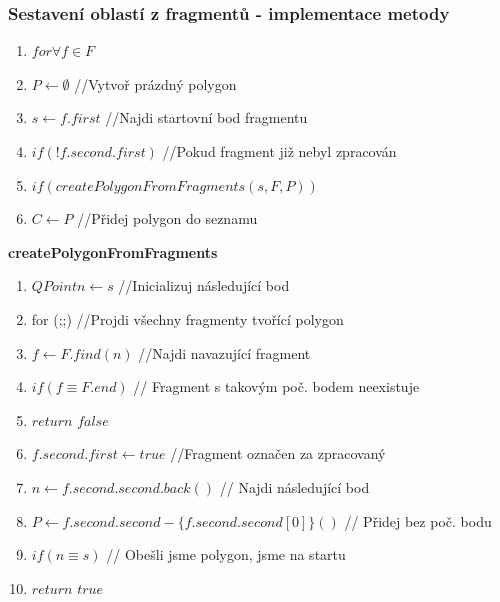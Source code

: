 \documentclass[a4paper, 12pt]{article}
\begin{document}
\subsubsection{Sestavení oblastí z fragmentů - implementace metody}
\begin{enumerate}
	\item $ for \forall f \in F $
	\item \hspace{1cm} $ P \longleftarrow \emptyset $ //Vytvoř prázdný polygon
	\item \hspace{1cm} $ s \longleftarrow f.first $ //Najdi startovní bod fragmentu
	\item \hspace{1cm} $ if (!f.second.first) $ //Pokud fragment již nebyl zpracován
		\item \hspace{2cm} $ if (createPolygonFromFragments(s,F,P)) $ 
			\item \hspace{3cm} $ C \longleftarrow P $ //Přidej polygon do seznamu	
\end{enumerate}
\clearpage

\textbf{createPolygonFromFragments}

\begin{enumerate}
	\item  $ QPoint n \longleftarrow s $ //Inicializuj následující bod
	\item for (;;) //Projdi všechny fragmenty tvořící polygon
	\item \hspace{1cm} $ f \longleftarrow F.find(n) $ //Najdi navazující fragment
	\item \hspace{1cm} $ if (f \equiv F.end) $ // Fragment s takovým poč. bodem neexistuje
	\item \hspace{2cm} $ return$ $ false $
	\item \hspace{1cm} $ f.second.first \longleftarrow true $ //Fragment označen za zpracovaný
	\item \hspace{1cm} $ n \longleftarrow f.second.second.back() $ // Najdi následující bod
	\item \hspace{1cm} $ P \longleftarrow f.second.second - \{f.second.second[0]\}() $ // Přidej bez poč. bodu
	\item \hspace{1cm} $ if (n \equiv s) $ // Obešli jsme polygon, jsme na startu
	\item \hspace{2cm} $ return$  $true $
\end{enumerate}
\end{document}
